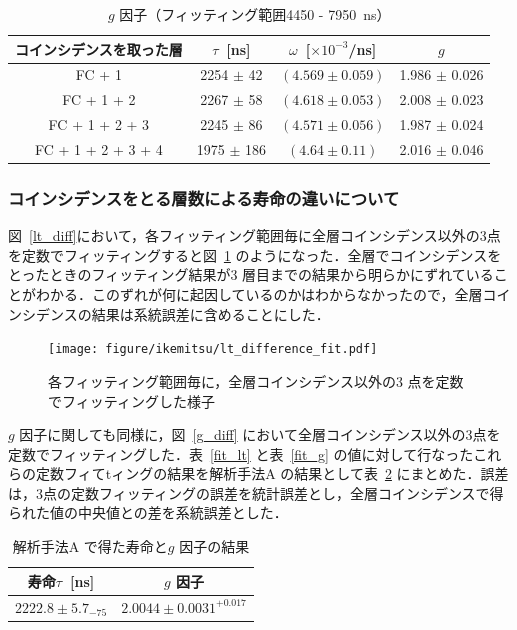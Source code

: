 \begin{table}[H]
\caption{$g$ 因子（フィッティング範囲4450 - 7950~ns） }
\label{fitrange4}
\centering
\begin{tabular}{cccc}\toprule
コインシデンスを取った層 & $\tau$~[ns] & $\omega$~[$\times 10^{-3}$/ns] & $g$ \\ \midrule
FC + 1 & 2254 $\pm$ 42 & $(4.569 \pm 0.059) $ & 1.986 $\pm$ 0.026 \\
FC + 1 + 2 & 2267 $\pm$ 58 & $(4.618 \pm 0.053) $ & 2.008 $\pm$ 0.023 \\
FC + 1 + 2 + 3 & 2245 $\pm$ 86 & $(4.571 \pm 0.056) $ & 1.987 $\pm$ 0.024\\
FC + 1 + 2 + 3 + 4 & 1975 $\pm$ 186& $(4.64 \pm 0.11) $ & 2.016 $\pm$ 0.046 \\ \bottomrule
\end{tabular}
\end{table}%

\subsubsection{コインシデンスをとる層数による寿命の違いについて}
図~\ref{lt_diff}において，各フィッティング範囲毎に全層コインシデンス以外の3点を定数でフィッティングすると図~\ref{lt_diff_fit} のようになった．全層でコインシデンスをとったときのフィッティング結果が3 層目までの結果から明らかにずれていることがわかる．このずれが何に起因しているのかはわからなかったので，全層コインシデンスの結果は系統誤差に含めることにした．

\begin{figure}[H]
\centering
\texttt{[image: figure/ikemitsu/lt\_difference\_fit.pdf]}
\caption{各フィッティング範囲毎に，全層コインシデンス以外の3 点を定数でフィッティングした様子}
\label{lt_diff_fit}
\end{figure}

$g$ 因子に関しても同様に，図~\ref{g_diff} において全層コインシデンス以外の3点を定数でフィッティングした．表~\ref{fit_lt} と表~\ref{fit_g} の値に対して行なったこれらの定数フィてtィングの結果を解析手法A の結果として表~\ref{kaisekiA_matome} にまとめた．誤差は，3点の定数フィッティングの誤差を統計誤差とし，全層コインシデンスで得られた値の中央値との差を系統誤差とした．

\begin{table}[H]
\caption{解析手法A で得た寿命と$g$ 因子の結果}
\label{kaisekiA_matome}
\centering
\begin{tabular}{cc}\toprule
寿命$\tau$~[ns] & $g$ 因子 \\ \midrule
$2222.8\pm5.7 _{-75}$ & $2.0044\pm 0.0031^{+0.017}$ \\ \bottomrule
\end{tabular}
\end{table}
  
